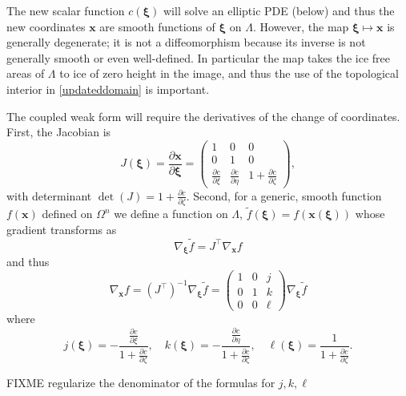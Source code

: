 \documentclass[letterpaper,final,12pt,reqno]{amsart}
\newcommand{\grad}{\nabla}
\newcommand{\bx}{\mathbf{x}}
\newcommand{\bxi}{\bm{\xi}}
\begin{document}
The new scalar function $c(\bxi)$ will solve an elliptic PDE (below) and thus the new coordinates $\bx$ are smooth functions of $\bxi$ on $\Lambda$.  However, the map $\bxi \mapsto \bx$ is generally degenerate; it is not a diffeomorphism because its inverse is not generally smooth or even well-defined.  In particular the map takes the ice free areas of $\Lambda$ to ice of zero height in the image, and thus the use of the topological interior in \eqref{updateddomain} is important.

The coupled weak form will require the derivatives of the change of coordinates.  First, the Jacobian is
\begin{equation}
J(\bxi) = \frac{\partial \bx}{\partial \bm{\xi}} = \begin{pmatrix} 1 & 0 & 0 \\  0 & 1 & 0 \\ \frac{\partial c}{\partial \xi} & \frac{\partial c}{\partial \eta} & 1+\frac{\partial c}{\partial \zeta} \end{pmatrix}, \label{jacchange}
\end{equation}
with determinant $\det(J)=1+\frac{\partial c}{\partial \zeta}$.  Second, for a generic, smooth function $f(\bx)$ defined on $\Omega^n$ we define a function on $\Lambda$, $\tilde f(\bxi) = f(\bx(\bxi))$ whose gradient transforms as
\begin{equation}
\grad_{\bxi} \tilde f = J^\top \grad_{\bx} f
\end{equation}
and thus
\begin{equation}
\grad_{\bx} f = (J^\top)^{-1} \grad_{\bxi} \tilde f = \begin{pmatrix} 1 & 0 & j \\ 0 & 1 & k \\ 0 & 0 & \ell \end{pmatrix} \grad_{\bxi} \tilde f \label{changederivatives}
\end{equation}
where
\begin{equation}
j(\bxi) = -\frac{\frac{\partial c}{\partial \xi}}{1+\frac{\partial c}{\partial \zeta}}, \quad k(\bxi) = -\frac{\frac{\partial c}{\partial \eta}}{1+\frac{\partial c}{\partial \zeta}}, \quad \ell(\bxi) = \frac{1}{1+\frac{\partial c}{\partial \zeta}}. \label{definejkl}
\end{equation}

FIXME regularize the denominator of the formulas for $j,k,\ell$
\end{document}
